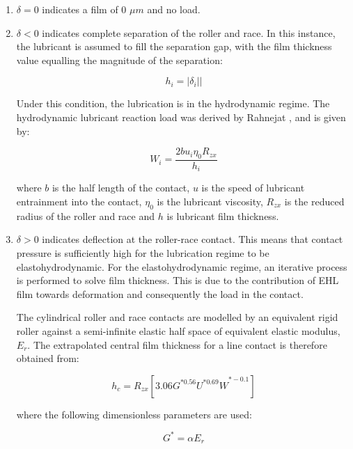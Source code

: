 \begin{enumerate}
	\item $\delta=0$ indicates a film of 0 $\mu m$ and no load.
	\item $\delta<0$ indicates complete separation of the roller and race. In this instance, the lubricant is assumed to fill the separation gap, with the film thickness value equalling the magnitude of the separation:
	
	\begin{equation}\label{hydrodynamic film thickness}
		h_i=\left|\delta_i\right||
	\end{equation}

	Under this condition, the lubrication is in the hydrodynamic regime. The hydrodynamic lubricant reaction load was derived by Rahnejat \cite{Rahnejat1984}, and is given by:
	
	\begin{equation}\label{hydrodynamic reaction load}
		W_i=\frac{2 b u_i \eta_0 R_{z x}}{h_i}
	\end{equation}

	where $b$ is the half length of the contact, $u$ is the speed of lubricant entrainment into the contact, $\eta_0$ is the lubricant viscosity, $R_{zx}$ is the reduced radius of the roller and race and $h$ is lubricant film thickness. 
	
	\item $\delta>0$ indicates deflection at the roller-race contact. This means that contact pressure is sufficiently high for the lubrication regime to be elastohydrodynamic. For the elastohydrodynamic regime, an iterative process is performed to solve film thickness. This is due to the contribution of EHL film towards deformation and consequently the load in the contact.
	
	The cylindrical roller and race contacts are modelled by an equivalent rigid roller against a semi-infinite elastic half space of equivalent elastic modulus, $E_r$. The extrapolated central film thickness for a line contact is therefore obtained \cite{Dowson1979} from:  
	
	\begin{equation}\label{dimensionless central film thickness}
	h_c=R_{zx}\left[{3.06G}^{\ast0.56}{U^{\ast0.69}W}^{\ast-0.1}\right]
    \end{equation}

	where the following dimensionless parameters are used:
		
	\begin{equation}\label{Gstar}
		G^*=\alpha E_r 
	\end{equation}
	

\end{enumerate}
